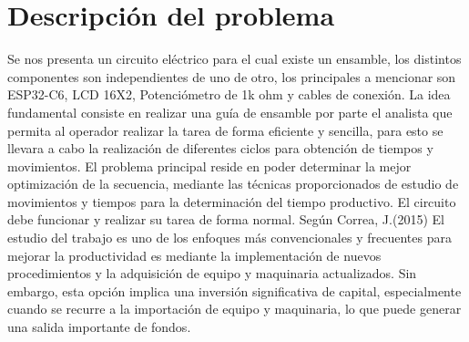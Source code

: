     \section{Descripción del problema}
    Se nos presenta un circuito eléctrico para el cual existe un ensamble, los distintos componentes son independientes de uno de otro, los principales a mencionar son ESP32-C6, LCD 16X2, Potenciómetro de 1k ohm y cables de conexión.
    La idea fundamental consiste en realizar una guía de ensamble por parte el analista que permita al operador realizar la tarea de forma eficiente y sencilla, para esto se llevara a cabo la realización de diferentes ciclos para obtención de tiempos y movimientos.
    El problema principal reside en poder determinar la mejor optimización de la secuencia, mediante las técnicas proporcionados de estudio de movimientos y tiempos para la determinación del tiempo productivo. El circuito debe funcionar y realizar su tarea de forma normal.
    Según Correa, J.(2015) El estudio del trabajo es uno de los enfoques más convencionales y frecuentes para mejorar la productividad es mediante la implementación de nuevos procedimientos y la adquisición de equipo y maquinaria actualizados. Sin embargo, esta opción implica una inversión significativa de capital, especialmente cuando se recurre a la importación de equipo y maquinaria, lo que puede generar una salida importante de fondos.
    
